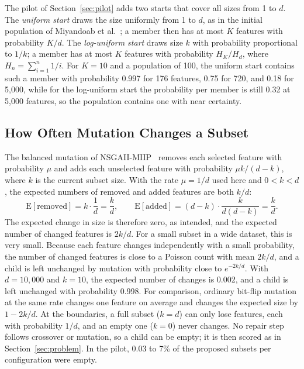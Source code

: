 The pilot of Section~\ref{sec:pilot} adds two starts that cover all sizes from 1 to $d$. The \emph{uniform start} draws the size uniformly from 1 to $d$, as in the initial population of Miyandoab et al.~\cite{Miyandoab2024}; a member then has at most $K$ features with probability $K/d$. The \emph{log-uniform start} draws size $k$ with probability proportional to $1/k$; a member has at most $K$ features with probability $H_K / H_d$, where $H_n = \sum_{i=1}^{n} 1/i$. For $K = 10$ and a population of 100, the uniform start contains such a member with probability 0.997 for 176 features, 0.75 for 720, and 0.18 for 5{,}000, while for the log-uniform start the probability per member is still 0.32 at 5{,}000 features, so the population contains one with near certainty.

\subsection{How Often Mutation Changes a Subset}
\label{sec:mutation}

The balanced mutation of NSGAII-MIIP~\cite{Oh2004,Li2025} removes each selected feature with probability $\mu$ and adds each unselected feature with probability $\mu k / (d - k)$, where $k$ is the current subset size. With the rate $\mu = 1/d$ used here and $0 < k < d$, the expected numbers of removed and added features are both $k/d$:
\begin{equation}
  \mathrm{E}[\text{removed}] = k \cdot \frac{1}{d} = \frac{k}{d},
  \qquad
  \mathrm{E}[\text{added}] = (d - k) \cdot \frac{k}{d(d - k)} = \frac{k}{d}.
  \label{eq:flips}
\end{equation}
The expected change in size is therefore zero, as intended, and the expected number of changed features is $2k/d$. For a small subset in a wide dataset, this is very small. Because each feature changes independently with a small probability, the number of changed features is close to a Poisson count with mean $2k/d$, and a child is left unchanged by mutation with probability close to $e^{-2k/d}$. With $d = 10{,}000$ and $k = 10$, the expected number of changes is 0.002, and a child is left unchanged with probability 0.998. For comparison, ordinary bit-flip mutation at the same rate changes one feature on average and changes the expected size by $1 - 2k/d$. At the boundaries, a full subset ($k = d$) can only lose features, each with probability $1/d$, and an empty one ($k = 0$) never changes. No repair step follows crossover or mutation, so a child can be empty; it is then scored as in Section~\ref{sec:problem}. In the pilot, 0.03 to 7\% of the proposed subsets per configuration were empty.

